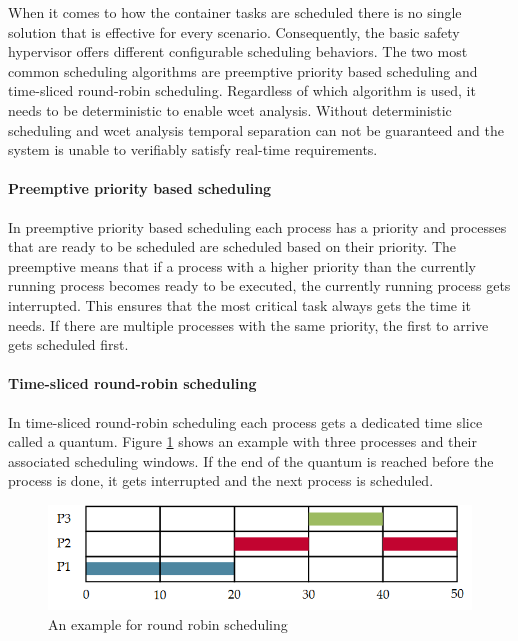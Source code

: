 When it comes to how the container tasks are scheduled there is no single solution that is effective for every scenario. Consequently, the basic safety hypervisor offers different configurable scheduling behaviors. The two most common scheduling algorithms are preemptive priority based scheduling and time-sliced round-robin scheduling. Regardless of which algorithm is used, it needs to be deterministic to enable \acrlong{wcet} analysis. Without deterministic scheduling and \acrshort{wcet} analysis temporal separation can not be guaranteed and the system is unable to verifiably satisfy real-time requirements.

\paragraph{Preemptive priority based scheduling}
In preemptive priority based scheduling each process has a priority and processes that are ready to be scheduled are scheduled based on their priority.
The preemptive means that if a process with a higher priority than the currently running process becomes ready to be executed, the currently running process gets interrupted. This ensures that the most critical task always gets the time it needs. If there are multiple processes with the same priority, the first to arrive gets scheduled first.

\paragraph{Time-sliced round-robin scheduling}
In time-sliced round-robin scheduling each process gets a dedicated time slice called a quantum. Figure \ref{fig:round_robin_example}  shows an example with three processes and their associated scheduling windows. If the end of the quantum is reached before the process is done, it gets interrupted and the next process is scheduled.
\begin{figure}[ht!]
\centering
\includegraphics[scale=0.75]{Figures/round_robin_example.png}
\decoRule
\caption{An example for round robin scheduling}
\label{fig:round_robin_example}
\end{figure}

